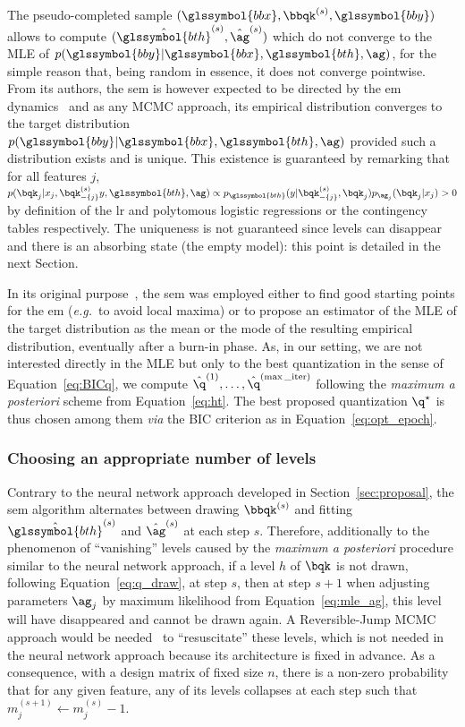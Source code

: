The pseudo-completed sample $(\glssymbol{bbx}, \bbqk^{(s)}, \glssymbol{bby})$ allows to compute $(\hat{\glssymbol{bth}}^{(s)},\hat{\ag}^{(s)})$ which do not converge to the MLE of $p(\glssymbol{bby} | \glssymbol{bbx}, \glssymbol{bth}, \ag)$, for the simple reason that, being random in essence, it does not converge pointwise. From its authors, the \gls{sem} is however expected to be directed by the \gls{em} dynamics~\cite{celeux_sem} and as any MCMC approach, its empirical distribution converges to the target distribution $p(\glssymbol{bby} | \glssymbol{bbx}, \glssymbol{bth}, \ag)$ provided such a distribution exists and is unique. This existence is guaranteed by remarking that for all features $j$, $ p(\bqk_j | x_j, \bqk^{(s)}_{-\{j\}} y, \glssymbol{bth}, \ag) \propto p_{\glssymbol{bth}}(y | \bqk^{(s)}_{-\{j\}}, \bqk_j) p_{\ag_j}(\bqk_j | x_j) > 0 $ by definition of the \gls{lr} and polytomous logistic regressions or the contingency tables respectively. The uniqueness is not guaranteed since levels can disappear and there is an absorbing state (the empty model): this point is detailed in the next Section.

In its original purpose~\cite{celeux_sem}, the \gls{sem} was employed either to find good starting points for the \gls{em} (\textit{e.g.}\ to avoid local maxima) or to propose an estimator of the MLE of the target distribution as the mean or the mode of the resulting empirical distribution, eventually after a burn-in phase. As, in our setting, we are not interested directly in the MLE but only to the best quantization in the sense of Equation~\eqref{eq:BICq}, we compute $\hat{\q}^{(1)}, \dots, \hat{\q}^{(\max\_{\text{iter}})}$ following the \textit{maximum a posteriori} scheme from Equation~\eqref{eq:ht}. The best proposed quantization $\q^\star$ is thus chosen among them \textit{via} the BIC criterion as in Equation~\eqref{eq:opt_epoch}.

\subsubsection{Choosing an appropriate number of levels}

Contrary to the neural network approach developed in Section~\ref{sec:proposal}, the \gls{sem} algorithm alternates between drawing $\bbqk^{(s)}$ and fitting $\hat{\glssymbol{bth}}^{(s)}$ and $\hat{\ag}^{(s)}$  at each step $s$. Therefore, additionally to the phenomenon of ``vanishing'' levels caused by the \textit{maximum a posteriori} procedure similar to the neural network approach, if a level $h$ of $\bqk$ is not drawn, following Equation~\eqref{eq:q_draw}, at step $s$, then at step $s+1$ when adjusting parameters $\ag_j$ by maximum likelihood from Equation~\eqref{eq:mle_ag}, this level will have disappeared and cannot be drawn again. A Reversible-Jump MCMC approach would be needed~\cite{green1995reversible} to ``resuscitate'' these levels, which is not needed in the neural network approach because its architecture is fixed in advance. As a consequence, with a design matrix of fixed size $n$, there is a non-zero probability that for any given feature, any of its levels collapses at each step such that $m_j^{(s+1)} \leftarrow m_j^{(s)} - 1$.

